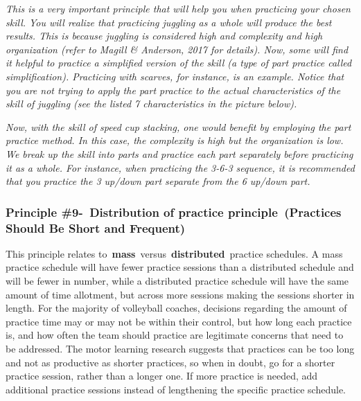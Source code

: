 \documentclass[
  letterpaper,
  DIV=11,
  numbers=noendperiod]{scrartcl}
\begin{document}
\emph{This is a very important principle that will help you when
practicing your chosen skill. You will realize that practicing juggling
as a whole will produce the best results. This is because juggling is
considered high and complexity and high organization (refer to Magill \&
Anderson, 2017 for details). Now, some will find it helpful to practice
a simplified version of the skill (a type of part practice called
simplification). Practicing with scarves, for instance, is an example.
Notice that you are not trying to apply the part practice to the actual
characteristics of the skill of juggling (see the listed 7
characteristics in the picture below).}

\emph{Now, with the skill of speed cup stacking, one would benefit by
employing the part practice method. In this case, the complexity is high
but the organization is low. We break up the skill into parts and
practice each part separately before practicing it as a whole. For
instance, when practicing the 3-6-3 sequence, it is recommended that you
practice the 3 up/down part separate from the 6 up/down part.}

\hypertarget{principle-9--distribution-of-practice-principle-practices-should-be-short-and-frequent}{%
\subsubsection{\texorpdfstring{\textbf{Principle \#9-~Distribution of
practice principle~(Practices Should Be Short and
Frequent)}}{Principle \#9-~Distribution of practice principle~(Practices Should Be Short and Frequent)}}\label{principle-9--distribution-of-practice-principle-practices-should-be-short-and-frequent}}

This principle relates
to~\textbf{mass}~versus~\textbf{distributed}~practice schedules. A mass
practice schedule will have fewer practice sessions than a distributed
schedule and will be fewer in number, while a distributed practice
schedule will have the same amount of time allotment, but across more
sessions making the sessions shorter in length. For the majority of
volleyball coaches, decisions regarding the amount of practice time may
or may not be within their control, but how long each practice is, and
how often the team should practice are legitimate concerns that need to
be addressed. The motor learning research suggests that practices can be
too long and not as productive as shorter practices, so when in doubt,
go for a shorter practice session, rather than a longer one. If more
practice is needed, add additional practice sessions instead of
lengthening the specific practice schedule.
\end{document}
